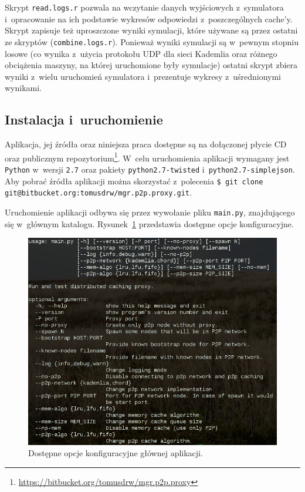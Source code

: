 \documentclass[a4paper,11pt]{scrartcl}
\newcommand{\f}{\texttt}
\newcommand{\keszy}{cache'y}
\begin{document}
Skrypt \f{read.logs.r} pozwala na wczytanie danych wyjściowych z~symulatora i~opracowanie na ich podstawie wykresów odpowiedzi z~poszczególnych \keszy. Skrypt zapisuje też uproszczone wyniki symulacji, które używane są przez ostatni ze skryptów (\f{combine.logs.r}). Ponieważ wyniki symulacji są w~pewnym stopniu losowe (co wynika z~użycia protokołu UDP dla sieci Kademlia oraz różnego obciążenia maszyny, na której uruchomione były symulacje) ostatni skrypt zbiera wyniki z~wielu uruchomień symulatora i~prezentuje wykresy z~uśrednionymi wynikami.

\subsection{Instalacja i~uruchomienie}
\label{sect_impl_install}
Aplikacja, jej źródła oraz niniejsza praca dostępne są na dołączonej płycie CD oraz publicznym repozytorium\footnote{\url{https://bitbucket.org/tomusdrw/mgr.p2p.proxy}}. W~celu uruchomienia aplikacji wymagany jest \f{Python} w~wersji \f{2.7} oraz pakiety \f{python2.7-twisted} i~\f{python2.7-simplejson}. Aby pobrać źródła aplikacji można skorzystać z~polecenia \f{\$ git clone git@bitbucket.org:tomusdrw/mgr.p2p.proxy.git}.

Uruchomienie aplikacji odbywa się przez wywołanie pliku \f{main.py}, znajdującego się w~głównym katalogu. Rysunek~\ref{fig_main_help} przedstawia dostępne opcje konfiguracyjne.

\begin{figure}[h]
\centering
\includegraphics[width=0.8\linewidth]{img/options.png}
\caption{Dostępne opcje konfiguracyjne głównej aplikacji.}
\label{fig_main_help}
\end{figure}
\end{document}

